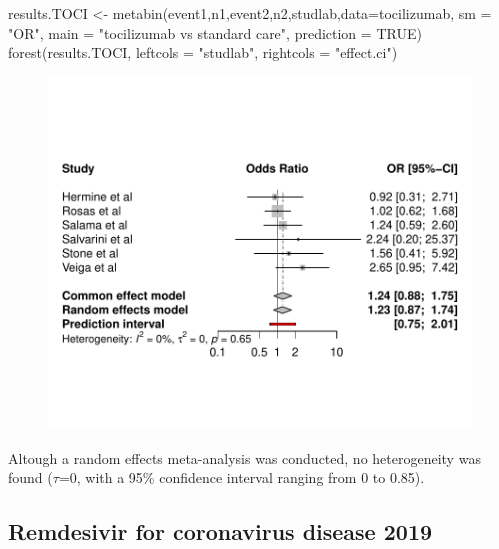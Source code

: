 \documentclass[
  letterpaper,
  DIV=11,
  numbers=noendperiod]{scrreprt}
\newenvironment{Shaded}{\begin{snugshade}}{\end{snugshade}}
\newcommand{\AttributeTok}[1]{\textcolor[rgb]{0.40,0.45,0.13}{#1}}
\newcommand{\ConstantTok}[1]{\textcolor[rgb]{0.56,0.35,0.01}{#1}}
\newcommand{\FunctionTok}[1]{\textcolor[rgb]{0.28,0.35,0.67}{#1}}
\newcommand{\NormalTok}[1]{\textcolor[rgb]{0.00,0.23,0.31}{#1}}
\newcommand{\OtherTok}[1]{\textcolor[rgb]{0.00,0.23,0.31}{#1}}
\newcommand{\StringTok}[1]{\textcolor[rgb]{0.13,0.47,0.30}{#1}}
\begin{document}
\begin{Shaded}
\begin{Highlighting}[]
\NormalTok{results.TOCI }\OtherTok{\textless{}{-}} \FunctionTok{metabin}\NormalTok{(event1,n1,event2,n2,studlab,}\AttributeTok{data=}\NormalTok{tocilizumab,}
                        \AttributeTok{sm =} \StringTok{"OR"}\NormalTok{, }\AttributeTok{main =} \StringTok{"tocilizumab vs standard care"}\NormalTok{, }
                        \AttributeTok{prediction =} \ConstantTok{TRUE}\NormalTok{)}
\FunctionTok{forest}\NormalTok{(results.TOCI, }\AttributeTok{leftcols =} \StringTok{"studlab"}\NormalTok{, }\AttributeTok{rightcols =} \StringTok{"effect.ci"}\NormalTok{)}
\end{Highlighting}
\end{Shaded}

\begin{figure}[H]

{\centering \includegraphics{chapter_10_files/figure-pdf/unnamed-chunk-5-1.pdf}

}

\end{figure}

Altough a random effects meta-analysis was conducted, no heterogeneity
was found (\(\tau\)=0, with a 95\% confidence interval ranging from 0 to
0.85).

\hypertarget{remdesivir-for-coronavirus-disease-2019}{%
\subsection{Remdesivir for coronavirus disease
2019}\label{remdesivir-for-coronavirus-disease-2019}}
\end{document}
